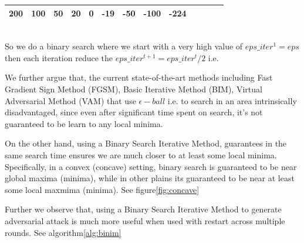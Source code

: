 \documentclass[letterpaper]{article} %
\begin{document}
\begin{tabular}{|c|c|c|c|c|c|c|c|c|c|c|c|c|}
\hline
    200 & 100 & 50 & 20 & 0 & -19 & -50 & -100 & -224 \\
    \hline
\end{tabular}
\\

So we do a binary search where we start with a very high value of $eps\_iter^{1}= eps$ then each iteration reduce the $eps\_iter^{t+1} = eps\_iter^{t}/ 2$
i.e.

We further argue that, the current state-of-the-art methods including Fast  Gradient  Sign  Method (FGSM), Basic  Iterative  Method  (BIM), Virtual  Adversarial  Method  (VAM)  that use $ \epsilon -ball $ i.e. to search in an area intrinsically disadvantaged, since even after significant time spent on search, it's not guaranteed to be learn to any local minima. 

On the other hand, using a Binary Search Iterative Method, guarantees in the same search time ensures we are much closer to at least some local minima. Specifically, in a convex (concave) setting, binary search is guaranteed to be near global maxima (minima), while in other plains its guaranteed to be near at least some local maxmima (minima). See figure\ref{fig:concave}

Further we observe that, using a Binary Search Iterative Method to generate adversarial attack is much more useful when used with restart across multiple rounds. See algorithm\ref{alg:binim}
\end{document}
